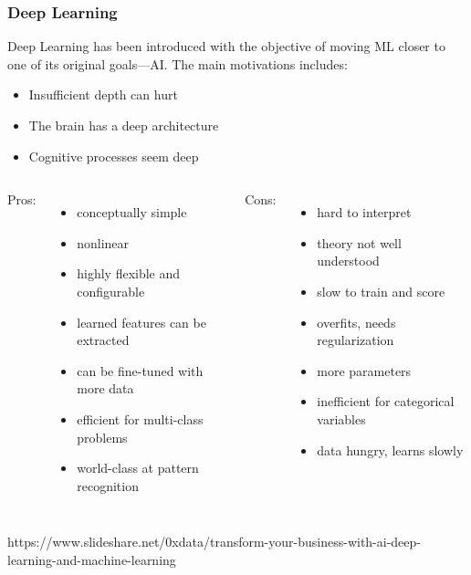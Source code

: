 \begin{frame}
  \MyLogo
  \frametitle{Deep Learning}  

\small

\begin{mdframed}[style=mystyle2]
Deep Learning has been introduced with the objective of moving ML closer to one of its original goals---AI. The main motivations includes:
%
\begin{itemize}\scriptsize\setlength\itemsep{0.2em}
\item Insufficient depth can hurt
\item The brain has a deep architecture
\item Cognitive processes seem deep
\end{itemize}
\end{mdframed}

\medskip

\begin{columns}

{\color{blue}Pros:}
\begin{itemize}\setlength\itemsep{0.2em}
\item conceptually simple
\item nonlinear 
\item highly flexible and configurable
\item learned features can be extracted
\item can be fine-tuned with more data
\item efficient for multi-class problems
\item world-class at pattern recognition
\end{itemize}

{\color{red}Cons:}
\begin{itemize}\setlength\itemsep{0.2em}
\item hard to interpret 
\item theory not well understood
\item slow to train and score
\item overfits, needs regularization
\item more parameters
\item inefficient for categorical variables
\item data hungry, learns slowly 
\end{itemize}
\end{columns}

\begin{center}
{\color{red} \scriptsize
https://www.slideshare.net/0xdata/transform-your-business-with-ai-deep-learning-and-machine-learning}
\end{center}

\end{frame}

